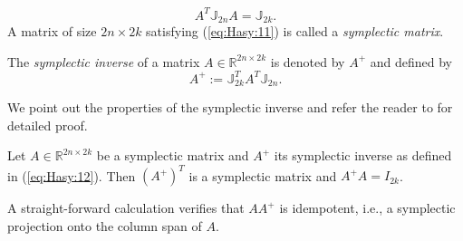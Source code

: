 \documentclass[final]{siamart}
\begin{document}
\begin{equation} \label{eq:Hasy:11}
	A^T \mathbb{J}_{2n}A = \mathbb{J}_{2k}.
\end{equation}
A matrix of size $2n\times 2k$ satisfying (\ref{eq:Hasy:11}) is called a \emph{symplectic matrix}.

\begin{definition}
	The \emph{symplectic inverse} of a matrix $A\in \mathbb{R}^{2n\times 2k}$ is denoted by $A^+$ and defined by {{\color{black}} \cite{Peng:2014di}}
\begin{equation}\label{eq:Hasy:12}
	A^+ := \mathbb{J}_{2k}^T A^T \mathbb{J}_{2n}.
\end{equation}
\end{definition}
We point out the properties of the symplectic inverse and refer the reader to \cite{Peng:2014di} for detailed proof.
\begin{lemma} \label{lemma:Hasy:1}
Let $A\in \mathbb{R}^{2n\times 2k}$ be a symplectic matrix and $A^+$ its symplectic inverse as defined in (\ref{eq:Hasy:12}). Then ${(A^+)}^T$ is a symplectic matrix and $A^+A = I_{2k}$.
\end{lemma}

{{\color{black}} A straight-forward calculation verifies} that $AA^+$ is idempotent, i.e., a symplectic projection onto the column span of $A$.
\end{document}

